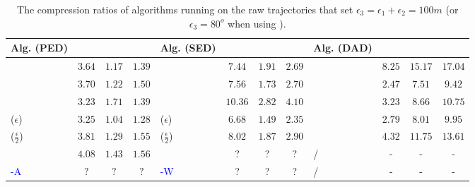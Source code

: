 {\begin{table}
	\caption{\small The compression ratios of algorithms running on the raw trajectories that set $\epsilon_3=\epsilon_1+\epsilon_2=100m$ (or $\epsilon_3=80^o$ when using \dad).}
	\centering
	\scriptsize
	\vspace{-1ex}
	\begin{tabular}{|l|c|c|c|l|c|c|c|l|c|c|c|}
		\hline
		\bf{Alg. (PED)}  &\ucar &\geolife &\mopsi & \bf{Alg. (SED)}  &\ucar &\geolife &\mopsi &\bf{Alg. (DAD)}  &\ucar &\geolife &\mopsi \\
		\hline
		{\dpa} &	$3.64$ & $ 1.17$ &	$1.39$	&\dpa &$7.44$ &$1.91$ & $2.69$ & \dpa	& $8.25$	& $15.17$	& $17.04$ \\
		\hline
		{\tpa} &	$3.70 $ & $1.22$ &	$1.50 $	&\tpa 	& $7.56 $& $1.73 $ &$2.70$ & \tpa	& $2.47 $	& $ 	7.51 $	& $ 	9.42  $ \\
		\hline
		{\bqsa} &	$3.23$ & $1.71$ &	$1.39 $	&\squishe &$10.36 $ & $ 2.82 $ & $4.10$ & \opwa	& $3.23$	& $8.66$	& $10.75$ \\
		\hline
		{\siped($\epsilon$)} &	$3.25$ & $ 1.04$ &	$1.28 $	&\cised($\epsilon$) & $6.68 $ &$ 	1.49 $ &$ 	2.35$ & \interval	& $2.79 $	& $8.01$	& $9.95 $ \\
		\hline
		{\siped($\frac{\epsilon}{2}$)} &	$3.81 $ & $1.29 $ &	$1.55 $ &\cised($\frac{\epsilon}{2}$) &$8.02  $ & $1.87$ & $2.90$& \intersec	& $4.32 $	& $11.75$	& $13.61 $ \\
		\hline
		{\operb} &	$4.08 $ & $1.43 $ & $1.56 $	& \textcolor{blue}{\dagots} &? &? &? & /&- &- &- \\
		\hline
		\textcolor{blue}{\operb-A} &	${?} $ & ${?} $ & ${?} $	& \textcolor{blue}{\cised-W} &? &? &? & / &- &- &- \\
		\hline
	\end{tabular}
	\label{tab:cr}	
	\vspace{-2ex}
\end{table}
 	 	
 	 	
 	 	


}
